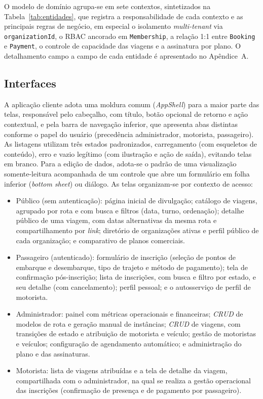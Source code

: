 \documentclass[12pt,openright,oneside,a4paper]{article}
\begin{document}
O modelo de domínio agrupa-se em sete contextos, sintetizados na Tabela~\ref{tab:entidades}, que registra a responsabilidade de cada contexto e as principais regras de negócio, em especial o isolamento \textit{multi-tenant} via \texttt{organizationId}, o RBAC ancorado em \texttt{Membership}, a relação 1:1 entre \texttt{Booking} e \texttt{Payment}, o controle de capacidade das viagens e a assinatura por plano. O detalhamento campo a campo de cada entidade é apresentado no Apêndice~A.


\subsection{Interfaces}
\label{sec:interfaces}

A aplicação cliente adota uma moldura comum (\textit{AppShell}) para a maior parte das telas, responsável pelo cabeçalho, com título, botão opcional de retorno e ação contextual, e pela barra de navegação inferior, que apresenta abas distintas conforme o papel do usuário (precedência administrador, motorista, passageiro). As listagens utilizam três estados padronizados, carregamento (com esqueletos de conteúdo), erro e vazio legítimo (com ilustração e ação de saída), evitando telas em branco. Para a edição de dados, adota-se o padrão de uma visualização somente-leitura acompanhada de um controle que abre um formulário em folha inferior (\textit{bottom sheet}) ou diálogo. As telas organizam-se por contexto de acesso:

\begin{itemize}
\item Público (sem autenticação): página inicial de divulgação; catálogo de viagens, agrupado por rota e com busca e filtros (data, turno, ordenação); detalhe público de uma viagem, com datas alternativas da mesma rota e compartilhamento por \textit{link}; diretório de organizações ativas e perfil público de cada organização; e comparativo de planos comerciais.
\item Passageiro (autenticado): formulário de inscrição (seleção de pontos de embarque e desembarque, tipo de trajeto e método de pagamento); tela de confirmação pós-inscrição; lista de inscrições, com busca e filtro por estado, e seu detalhe (com cancelamento); perfil pessoal; e o autosserviço de perfil de motorista.
\item Administrador: painel com métricas operacionais e financeiras; \textit{CRUD} de modelos de rota e geração manual de instâncias; \textit{CRUD} de viagens, com transições de estado e atribuição de motorista e veículo; gestão de motoristas e veículos; configuração de agendamento automático; e administração do plano e das assinaturas.
\item Motorista: lista de viagens atribuídas e a tela de detalhe da viagem, compartilhada com o administrador, na qual se realiza a gestão operacional das inscrições (confirmação de presença e de pagamento por passageiro).
\end{itemize}
\end{document}
